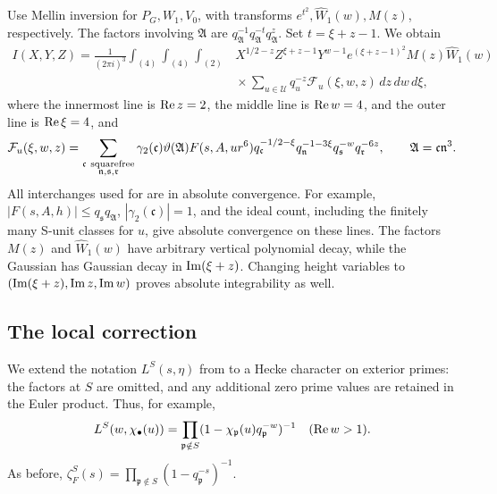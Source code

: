 Use Mellin inversion for \(P_G,W_1,V_0\), with transforms
\(e^{t^2},\widehat W_1(w),M(z)\), respectively.  The factors involving
\(\mathfrak A\) are
\(q_{\mathfrak A}^{-1}q_{\mathfrak A}^{-t}q_{\mathfrak A}^{z}\).
Set \(t=\xi+z-1\).  We obtain
\begin{equation}
 \begin{split}
 I(X,Y,Z)=\frac1{(2\pi i)^3}
  \int_{(4)}\int_{(4)}\int_{(2)}
  &X^{1/2-z}Z^{\xi+z-1}Y^{w-1}
   e^{(\xi+z-1)^2}M(z)\widehat W_1(w)\\
  &{}\times\sum_{u\in\mathcal U}q_u^{-z}
       \mathcal F_u(\xi,w,z)\,dz\,dw\,d\xi ,
 \end{split}
\label{eq:poisson-mellin}
\end{equation}
where the innermost line is \(\operatorname{Re} z=2\), the middle line is
\(\operatorname{Re} w=4\), and the outer line is \(\operatorname{Re}\xi=4\), and
\begin{equation}
 \mathcal F_u(\xi,w,z)=
 \sum_{\substack{\mathfrak c\ {\rm squarefree}\\
                  \mathfrak n,\mathfrak s,\mathfrak r}}
 \gamma_2(\mathfrak c)\vartheta(\mathfrak A)F(s,A,ur^6)
 q_{\mathfrak c}^{-1/2-\xi}q_{\mathfrak n}^{-1-3\xi}
 q_{\mathfrak s}^{-w}q_{\mathfrak r}^{-6z},
 \qquad \mathfrak A=\mathfrak c\mathfrak n^3.
\label{eq:calF-definition}
\end{equation}
All interchanges used for  are in absolute
convergence.  For example,
\(|F(s,A,h)|\le q_{\mathfrak s}q_{\mathfrak A}\),
\(|\gamma_2(\mathfrak c)|=1\), and the ideal count, including the finitely
many S-unit classes for \(u\), give absolute convergence on these lines.
The factors \(M(z)\) and \(\widehat W_1(w)\) have arbitrary vertical
polynomial decay, while the Gaussian has Gaussian decay in
\(\operatorname{Im}(\xi+z)\).  Changing height variables to
\((\operatorname{Im}(\xi+z),\operatorname{Im} z,\operatorname{Im} w)\) proves absolute integrability as well.

\subsection{The local correction}

We extend the notation \(L^S(s,\eta)\) from
 to a Hecke character on exterior primes:
the factors at \(S\) are omitted, and any additional zero prime values
are retained in the Euler product.
Thus, for example,
\[
 L^S(w,\chi_\bullet(u))
    =\prod_{\mathfrak p\notin S}
       (1-\chi_{\mathfrak p}(u)q_{\mathfrak p}^{-w})^{-1}
 \quad(\operatorname{Re} w>1).
\]
As before,
\(\zeta_F^S(s)=\prod_{\mathfrak p\notin S}(1-q_{\mathfrak p}^{-s})^{-1}\).

